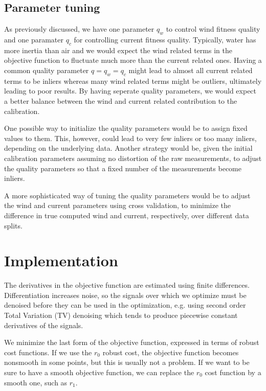 \documentclass{article}
\newcommand{\quality}[1]{q_{#1}}
\begin{document}
\subsection{Parameter tuning}
As previously discussed, we have one parameter $\quality{w}$ to control wind fitness quality and one paramater $\quality{c}$ for controlling current fitness quality. Typically, water has more inertia than air and we would expect the wind related terms in the objective function to fluctuate much more than the current related ones. Having a common quality parameter $q = \quality{w} = \quality{c}$ might lead to almost all current related terms to be inliers whereas many wind related terms might be outliers, ultimately leading to poor results. By having seperate quality parameters, we would expect a better balance between the wind and current related contribution to the calibration.

One possible way to initialize the quality parameters would be to assign fixed values to them. This, however, could lead to very few inliers or too many inliers, depending on the underlying data. Another strategy would be, given the initial calibration parameters assuming no distortion of the raw measurements, to adjust the quality parameters so that a fixed number of the measurements become inliers.

A more sophisticated way of tuning the quality parameters would be to adjust the wind and current parameters using cross validation, to minimize the difference in true computed wind and current, respectively, over different data splits.
\section{Implementation}
The derivatives in the objective function are estimated using finite differences. Differentiation increases noise, so the signals over which we optimize must be denoised before they can be used in the optimization, e.g. using second order Total Variation (TV) denoising which tends to produce piecewise constant derivatives of the signals.

We minimize the last form of the objective function, expressed in terms of robust cost functions. If we use the $r_0$ robust cost, the objective function becomes nonsmooth in some points, but this is usually not a problem. If we want to be sure to have a smooth objective function, we can replace the $r_0$ cost function by a smooth one, such as $r_1$.
\end{document}
